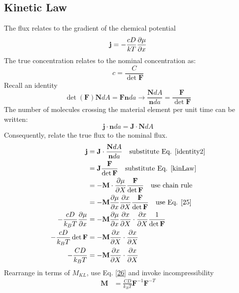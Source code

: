 \documentclass[12pt,3p]{article}
\numberwithin{equation}{section}
\begin{document}
\subsection{Kinetic Law}
The flux relates to the gradient of the chemical potential
\begin{equation}\label{25}
\mathbf{j} = - \frac{cD}{kT} \pdv{\mu}{x}
\end{equation}
The true concentration relates to the nominal concentration as: 
\begin{equation}\label{26}
c = \frac{C}{\det \mathbf{F}}
\end{equation}
Recall an identity 
\begin{equation}\label{identity2}
\det (\mathbf{F}) \mathbf{N} dA = \mathbf{F} \mathbf{n} da \rightarrow \frac{\mathbf{N} dA}{\mathbf{n} da} = \frac{\mathbf{F}}{\det \mathbf{F}}
\end{equation}
The number of molecules crossing the material element per unit time can be written:
\begin{equation}\label{27}
\mathbf{j} \cdot \mathbf{n} da = \mathbf{J} \cdot \mathbf{N} dA
\end{equation}
Consequently, relate the true flux to the nominal flux.
\begin{align*}
\mathbf{j} &= \mathbf{J} \cdot \frac{\mathbf{N} dA}{\mathbf{n} da} \quad \text{substitute Eq. \ref{identity2}}\\
    &= \mathbf{J} \frac{\mathbf{F}}{\det \mathbf{F}} \quad \text{substitute Eq. \ref{kinLaw}} \\
    &= -\mathbf{M} \cdot \pdv{\mu}{X} \frac{\mathbf{F}}{\det \mathbf{F}} \quad \text{use chain rule} \\
    &= - \mathbf{M} \pdv{\mu}{x} \pdv{x}{X} \frac{\mathbf{F}}{\det \mathbf{F}} \quad \text{use Eq. \ref{25}} \\
- \frac{cD}{k_B T} \pdv{\mu}{x} &= - \mathbf{M} \pdv{\mu}{x} \pdv{x}{X} \cdot \pdv{x}{X} \frac{1}{\det \mathbf{F}} \\
- \frac{cD}{k_B T} \det \mathbf{F} &= - \mathbf{M} \pdv{x}{X} \cdot \pdv{x}{X} \\
- \frac{CD}{k_B T} &= - \mathbf{M} \pdv{x}{X} \cdot \pdv{x}{X} \\
\end{align*}
Rearrange in terms of $M_{KL}$, use Eq. \ref{26} and invoke incompressibility
\begin{align*}
\mathbf{M} &= \frac{CD}{k_B T} \mathbf{F}^{-1} \mathbf{F}^{-T} 
\end{align*}
\end{document}
